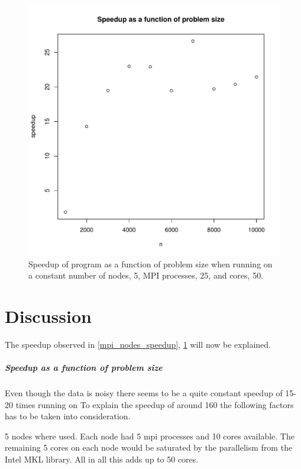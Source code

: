 \documentclass{article}
\begin{document}
\begin{figure}[H]
  \begin{center}
    \includegraphics[width=12cm]{../analysis/problem_size_speedup.pdf}
  \end{center}
  \caption{Speedup of program as a function of problem size when running on a constant number of nodes, 5, MPI processes, 25, and cores, 50.}
  \label{problem_size_speedup}
\end{figure}

\section{Discussion}
The speedup observed in \ref{mpi_nodes_speedup}, \ref{problem_size_speedup}
will now be explained.
\subparagraph{Speedup as a function of problem size}
Even though the data is noisy there seems to be a quite constant
speedup of 15-20 times running on 
To explain the speedup of around 160 the following factors has
to be taken into consideration.

5 nodes where used. Each node had
5 mpi processes and 10 cores available. The remaining 5 cores on each
node would be saturated by the parallelism from the Intel MKL library.
All in all this adds up to 50 cores.

\end{document}
